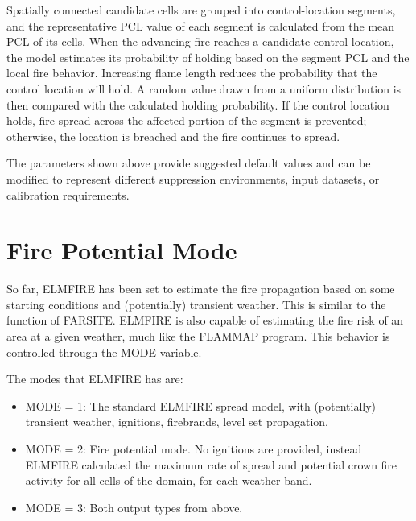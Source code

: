 Spatially connected candidate cells are grouped into control-location segments,
and the representative PCL value of each segment is calculated from the mean PCL
of its cells. When the advancing fire reaches a candidate control location, the
model estimates its probability of holding based on the segment PCL and the local
fire behavior. Increasing flame length reduces the probability that the control
location will hold. A random value drawn from a uniform distribution is then
compared with the calculated holding probability. If the control location holds,
fire spread across the affected portion of the segment is prevented; otherwise,
the location is breached and the fire continues to spread.

The parameters shown above provide suggested default values and can be modified
to represent different suppression environments, input datasets, or calibration
requirements.





















\section{Fire Potential Mode}
\label{fire_potential}

So far, ELMFIRE has been set to estimate the fire propagation based on some starting conditions and (potentially) transient weather. This is similar to the function of FARSITE. ELMFIRE is also capable of estimating the fire risk of an area at a given weather, much like the FLAMMAP program. This behavior is controlled through the MODE variable. 

The modes that ELMFIRE has are:

\begin{itemize}
    \item MODE = 1: The standard ELMFIRE spread model, with (potentially) transient weather, ignitions, firebrands, level set propagation. 
    \item MODE = 2: Fire potential mode. No ignitions are provided, instead ELMFIRE calculated the maximum rate of spread and potential crown fire activity for all cells of the domain, for each weather band. 
    \item MODE = 3: Both output types from above. 
\end{itemize}

